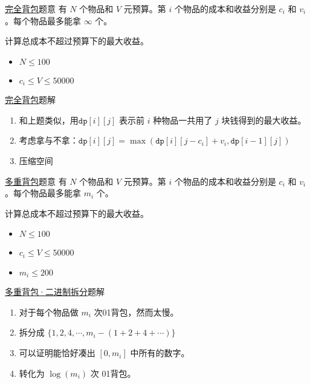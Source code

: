 \documentclass{beamer}
\begin{document}
\begin{frame}{\href{https://vjudge.net/problem/51Nod-2649}{完全背包}}{题意}
有 $N$ 个物品和 $V$ 元预算。第 $i$ 个物品的成本和收益分别是 $c_i$ 和 $v_i$。每个物品最多能拿 $\infty$ 个。

计算总成本不超过预算下的最大收益。

\begin{itemize}
    \item $ N \le 100$
    \item $ c_i\le V \le 50000$
\end{itemize}

\end{frame}
\begin{frame}{\href{https://vjudge.net/problem/51Nod-2649}{完全背包}}{题解}
\begin{enumerate}
    \item 和上题类似，用$\texttt{dp}[i][j]$ 表示前 $i$ 种物品一共用了 $j$ 块钱得到的最大收益。
    \item 考虑拿与不拿：$\texttt{dp}[i][j] = \max(\texttt{dp}[i][j-c_i]+v_i,\texttt{dp}[i-1][j])$
    \item 压缩空间

\end{enumerate}

\end{frame}

\begin{frame}{\href{https://vjudge.net/problem/51Nod-1086}{多重背包}}{题意}
有 $N$ 个物品和 $V$ 元预算。第 $i$ 个物品的成本和收益分别是 $c_i$ 和 $v_i$。每个物品最多能拿 $m_i$ 个。

计算总成本不超过预算下的最大收益。

\begin{itemize}
    \item $ N \le 100$
    \item $ c_i\le V \le 50000$
    \item $ m_i \le 200$
\end{itemize}
\end{frame}



\begin{frame}{\href{https://vjudge.net/problem/51Nod-1086}{多重背包·二进制拆分}}{题解}
\begin{enumerate}
    \item 对于每个物品做 $m_i$ 次01背包，然而太慢。
    \item 拆分成 $\{1,2,4,\cdots , m_i -(1+2+4+\cdots)\}$
    \item 可以证明能恰好凑出 $[0,m_i]$ 中所有的数字。
    \item 转化为 $\log(m_i)$ 次 01背包。
\end{enumerate}
\end{frame}
\end{document}
